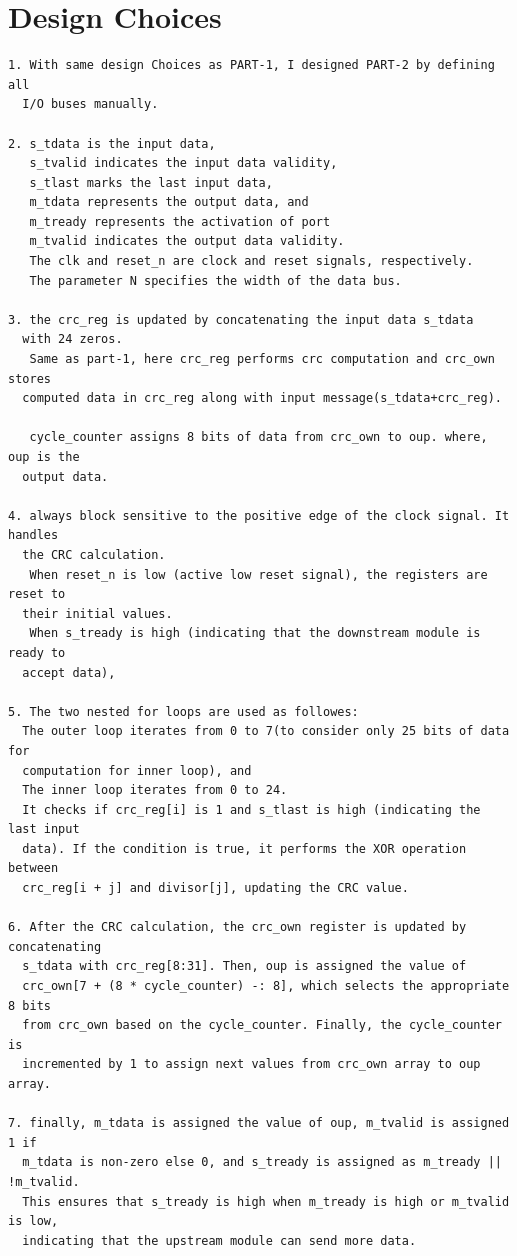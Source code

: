 \documentclass{article}
\begin{document}
\vspace{13cm}
\section{Design Choices}
\vspace{1cm}
\begin{lstlisting}
1. With same design Choices as PART-1, I designed PART-2 by defining all 
  I/O buses manually.
  
2. s_tdata is the input data,
   s_tvalid indicates the input data validity,
   s_tlast marks the last input data, 
   m_tdata represents the output data, and 
   m_tready represents the activation of port
   m_tvalid indicates the output data validity. 
   The clk and reset_n are clock and reset signals, respectively. 
   The parameter N specifies the width of the data bus.
   
3. the crc_reg is updated by concatenating the input data s_tdata 
  with 24 zeros.
   Same as part-1, here crc_reg performs crc computation and crc_own stores 
  computed data in crc_reg along with input message(s_tdata+crc_reg).
   
   cycle_counter assigns 8 bits of data from crc_own to oup. where, oup is the 
  output data.
   
4. always block sensitive to the positive edge of the clock signal. It handles 
  the CRC calculation. 
   When reset_n is low (active low reset signal), the registers are reset to 
  their initial values.
   When s_tready is high (indicating that the downstream module is ready to 
  accept data), 

5. The two nested for loops are used as followes:
  The outer loop iterates from 0 to 7(to consider only 25 bits of data for 
  computation for inner loop), and 
  The inner loop iterates from 0 to 24.
  It checks if crc_reg[i] is 1 and s_tlast is high (indicating the last input 
  data). If the condition is true, it performs the XOR operation between 
  crc_reg[i + j] and divisor[j], updating the CRC value.

6. After the CRC calculation, the crc_own register is updated by concatenating 
  s_tdata with crc_reg[8:31]. Then, oup is assigned the value of 
  crc_own[7 + (8 * cycle_counter) -: 8], which selects the appropriate 8 bits 
  from crc_own based on the cycle_counter. Finally, the cycle_counter is 
  incremented by 1 to assign next values from crc_own array to oup array.

7. finally, m_tdata is assigned the value of oup, m_tvalid is assigned 1 if 
  m_tdata is non-zero else 0, and s_tready is assigned as m_tready || !m_tvalid. 
  This ensures that s_tready is high when m_tready is high or m_tvalid is low, 
  indicating that the upstream module can send more data.

\end{lstlisting}
\vspace{10cm}
\end{document}
